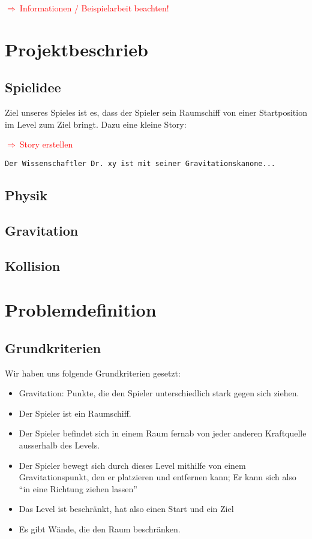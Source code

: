 \documentclass[12pt,a4paper]{scrartcl}
\newcommand{\q}[1]{``#1''}
\newcommand{\todo}[1]{\begin{Large}\textcolor{red}{$\Rightarrow ~$#1}\end{Large}}
\begin{document}


\clearpage

\tableofcontents

\clearpage

\todo{Informationen / Beispielarbeit beachten!}

\section{Projektbeschrieb}
\subsection{Spielidee}
Ziel unseres Spieles ist es, dass der Spieler sein Raumschiff von einer Startposition im Level
zum Ziel bringt. Dazu eine kleine Story:
\todo{Story erstellen}
\begin{verbatim}
Der Wissenschaftler Dr. xy ist mit seiner Gravitationskanone...
\end{verbatim}

\subsection{Physik}
\subsection{Gravitation}

\subsection{Kollision}




\section{Problemdefinition}
\subsection{Grundkriterien}
Wir haben uns folgende Grundkriterien gesetzt:
\begin{itemize}
\item Gravitation: Punkte, die den Spieler unterschiedlich stark gegen sich ziehen.
\item Der Spieler ist ein Raumschiff.
\item Der Spieler befindet sich in einem Raum fernab von jeder anderen Kraftquelle ausserhalb des Levels.
\item Der Spieler bewegt sich durch dieses Level mithilfe von  einem Gravitationspunkt, den er platzieren und entfernen kann; Er kann sich also \q{in eine Richtung ziehen lassen}
\item Das Level ist beschränkt, hat also einen Start und ein Ziel
\item Es gibt Wände, die den Raum beschränken.
\end{itemize}
\end{document}
